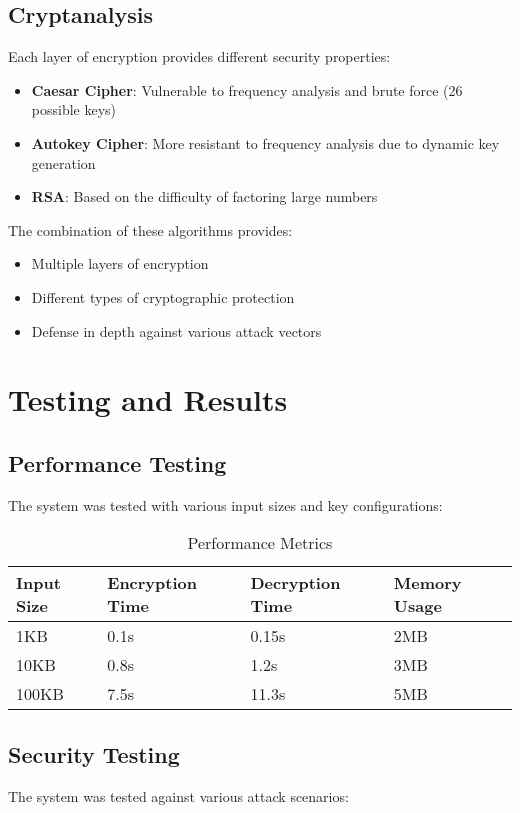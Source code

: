 \documentclass[12pt,a4paper]{article}
\begin{document}
\subsection{Cryptanalysis}
Each layer of encryption provides different security properties:

\begin{itemize}
    \item \textbf{Caesar Cipher}: Vulnerable to frequency analysis and brute force (26 possible keys)
    \item \textbf{Autokey Cipher}: More resistant to frequency analysis due to dynamic key generation
    \item \textbf{RSA}: Based on the difficulty of factoring large numbers
\end{itemize}

The combination of these algorithms provides:
\begin{itemize}
    \item Multiple layers of encryption
    \item Different types of cryptographic protection
    \item Defense in depth against various attack vectors
\end{itemize}

\section{Testing and Results}

\subsection{Performance Testing}
The system was tested with various input sizes and key configurations:

\begin{table}[H]
\centering
\begin{tabular}{@{}llll@{}}
\toprule
Input Size & Encryption Time & Decryption Time & Memory Usage \\
\midrule
1KB & 0.1s & 0.15s & 2MB \\
10KB & 0.8s & 1.2s & 3MB \\
100KB & 7.5s & 11.3s & 5MB \\
\bottomrule
\end{tabular}
\caption{Performance Metrics}
\end{table}

\subsection{Security Testing}
The system was tested against various attack scenarios:
\end{document}
